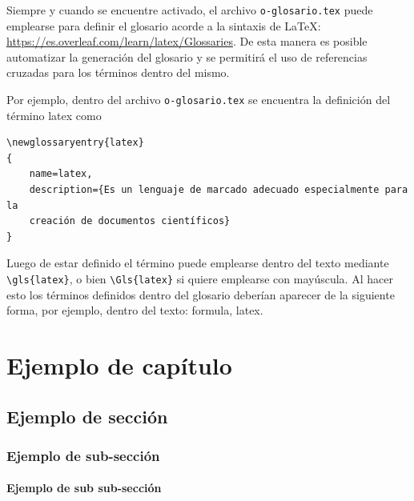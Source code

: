 Siempre y cuando se encuentre activado, el archivo  \verb|o-glosario.tex| puede emplearse para definir el glosario acorde a la sintaxis de \LaTeX: \href{https://es.overleaf.com/learn/latex/Glossaries}{https://es.overleaf.com/learn/latex/Glossaries}. De esta manera es posible automatizar la generación del glosario y se permitirá el uso de referencias cruzadas para los términos dentro del mismo. 

Por ejemplo, dentro del archivo \verb|o-glosario.tex| se encuentra la definición del término \gls{latex} como
\begin{verbatim}
\newglossaryentry{latex}
{
    name=latex,
    description={Es un lenguaje de marcado adecuado especialmente para la 
    creación de documentos científicos}
}    
\end{verbatim}

Luego de estar definido el término puede emplearse dentro del texto mediante \verb|\gls{latex}|, o bien \verb|\Gls{latex}| si quiere emplearse con mayúscula. Al hacer esto los términos definidos dentro del glosario deberían aparecer de la siguiente forma, por ejemplo, dentro del texto: \gls{formula}, \Gls{latex}.


\chapter{Ejemplo de capítulo}

\section{Ejemplo de sección}
\subsection{Ejemplo de sub-sección}

\subsubsection{Ejemplo de sub sub-sección}

